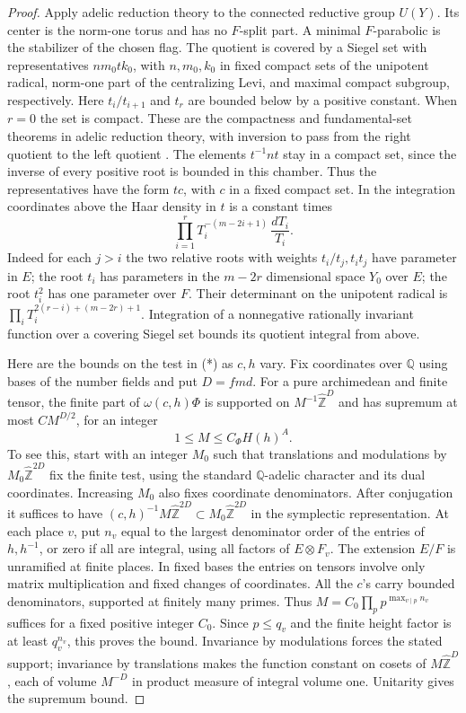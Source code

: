 \begin{proof}
Apply adelic reduction theory to the connected reductive group \(U(Y)\).
Its center is the norm-one torus and has no \(F\)-split part.
A minimal \(F\)-parabolic is the stabilizer of the chosen flag.
The quotient is covered by a Siegel set with representatives
\(n m_0 t k_0\), with \(n,m_0,k_0\) in fixed compact sets of the
unipotent radical, norm-one part of the centralizing Levi, and
maximal compact subgroup, respectively. Here \(t_i/t_{i+1}\) and
\(t_r\) are bounded below by a positive constant. When \(r=0\) the
set is compact. These are the compactness and fundamental-set theorems
in adelic reduction theory, with inversion to pass from the right
quotient to the left quotient \cite[\S\S2.1--2.2]{springerReduction}.
The elements \(t^{-1}nt\) stay in a compact set, since the inverse
of every positive root is bounded in this chamber. Thus the
representatives have the form \(tc\), with \(c\) in a fixed compact
set. In the integration coordinates above the Haar density in \(t\)
is a constant times
\[
       \prod_{i=1}^{r} T_i^{-(m-2i+1)}\,\frac{dT_i}{T_i}.
\]
Indeed for each \(j>i\) the two relative roots with weights
\(t_i/t_j,t_it_j\) have parameter in \(E\); the root \(t_i\) has
parameters in the \(m-2r\) dimensional space \(Y_0\) over \(E\);
the root \(t_i^2\) has one parameter over \(F\). Their determinant
on the unipotent radical is
\(\prod_i T_i^{2(r-i)+(m-2r)+1}\).
Integration of a nonnegative rationally invariant function over a
covering Siegel set bounds its quotient integral from above.

Here are the bounds on the test in (*) as \(c,h\) vary. Fix coordinates
over \(\mathbb Q\) using bases of the number fields and put \(D=fmd\).
For a pure archimedean and finite tensor, the finite part of
\(\omega(c,h)\Phi\) is supported on \(M^{-1}\widehat{\mathbb Z}^{D}\)
and has supremum at most \(C M^{D/2}\), for an integer
\[
             1\le M\le C_\Phi H(h)^A .
\]
To see this, start with an integer \(M_0\) such that translations and
modulations by \(M_0\widehat{\mathbb Z}^{2D}\) fix the finite test,
using the standard \(\mathbb Q\)-adelic character and its dual
coordinates. Increasing \(M_0\) also fixes coordinate denominators.
After conjugation it suffices to have
\((c,h)^{-1}M\widehat{\mathbb Z}^{2D}\subset
 M_0\widehat{\mathbb Z}^{2D}\) in the symplectic representation.
At each place \(v\), put \(n_v\) equal to the largest denominator
order of the entries of \(h,h^{-1}\), or zero if all are integral,
using all factors of \(E\otimes F_v\). The extension \(E/F\) is
unramified at finite places. In fixed bases the entries on tensors
involve only matrix multiplication and fixed changes of coordinates.
All the \(c\)'s carry bounded denominators, supported at finitely many
primes. Thus \(M=C_0\prod_{p}p^{\max_{v\mid p}n_v}\) suffices for
a fixed positive integer \(C_0\). Since \(p\le q_v\) and the finite
height factor is at least \(q_v^{n_v}\), this proves the bound.
Invariance by modulations forces the stated support; invariance by
translations makes the function constant on cosets of
\(M\widehat{\mathbb Z}^{D}\), each of volume \(M^{-D}\) in product
measure of integral volume one. Unitarity gives the supremum bound.


\end{proof}
